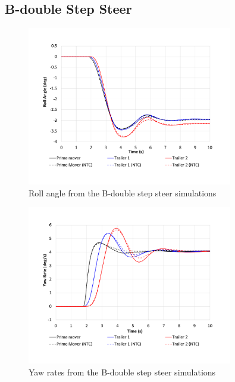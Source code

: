 \subsection{B-double Step Steer}\label{appendix:b-double-validation-ss}

    \begin{figure}[H]
        \centering
        \includegraphics[width=0.8\textwidth]{fig/ntc-b-double_ssa}
        \caption{Roll angle from the B-double step steer simulations}
        \label{figure:ntc-b-double_ssa}
    \end{figure}

    \begin{figure}[H]
        \centering
        \includegraphics[width=0.8\textwidth]{fig/ntc-b-double_ssb}
        \caption{Yaw rates from the B-double step steer simulations}
        \label{figure:ntc-b-double_ssb}
    \end{figure}

